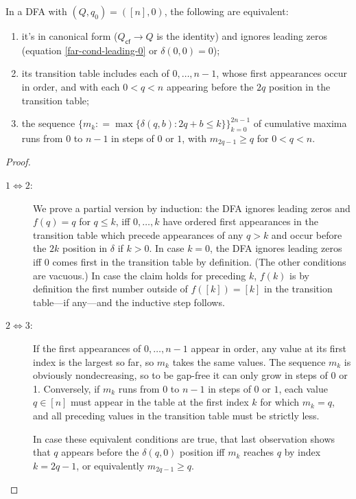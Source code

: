 \begin{lemma}\normalfont
  \label{far-dfa-canonical form}
  In a DFA with $(Q,q_0)=([n],0)$, the following are equivalent:
  \begin{enumerate}
    \item it's in canonical form ($Q_\textsf{cf}\to Q$ is the identity)
          and ignores leading zeros (equation \eqref{far-cond-leading-0} or $\delta(0,0)=0$);
    \item its transition table includes each of $0,\ldots,n-1$, whose first appearances occur in order,
          and with each $0 < q < n$ appearing before the $2q$ position in the transition table;
    \item the sequence $\{m_k \mathrel{\mathop:}= \max\{\delta(q,b): 2q+b\le k\}\}_{k=0}^{2n-1}$ of cumulative maxima runs from $0$ to $n-1$ in steps of $0$ or $1$,
          with $m_{2q-1}\ge q$ for $0<q<n$.
  \end{enumerate}
\end{lemma}
\begin{proof}
  \begin{description}
    \item[$1\iff 2$:]
          We prove a partial version by induction:
          the DFA ignores leading zeros and $f(q)=q$ for $q\le k$,
          iff $0,\ldots,k$ have ordered first appearances in the transition table
          which precede appearances of any $q>k$
          and occur before the $2k$ position in $\delta$ if $k>0$.
          In case $k=0$, the DFA ignores leading zeros iff $0$ comes first in the transition table by definition.
          (The other conditions are vacuous.)
          In case the claim holds for preceding $k$, $f(k)$ is by definition the first number outside of $f([k])=[k]$ in the transition table---if any---and the inductive step follows.
    \item[$2\iff 3$:]
          If the first appearances of $0,\ldots,n-1$ appear in order, any value at its first index is the largest so far, so $m_k$ takes the same values. The sequence $m_k$ is obviously nondecreasing, so to be gap-free it can only grow in steps of 0 or 1.
          Conversely, if $m_k$ runs from $0$ to $n-1$ in steps of $0$ or $1$, each value $q\in [n]$ must appear in the table at the first index $k$ for which $m_k=q$, and all preceding values in the transition table must be strictly less.

          In case these equivalent conditions are true, that last observation shows that $q$ appears before the $\delta(q,0)$ position iff $m_k$ reaches $q$ by index $k=2q-1$, or equivalently $m_{2q-1}\ge q$.
  \end{description}
\end{proof}

